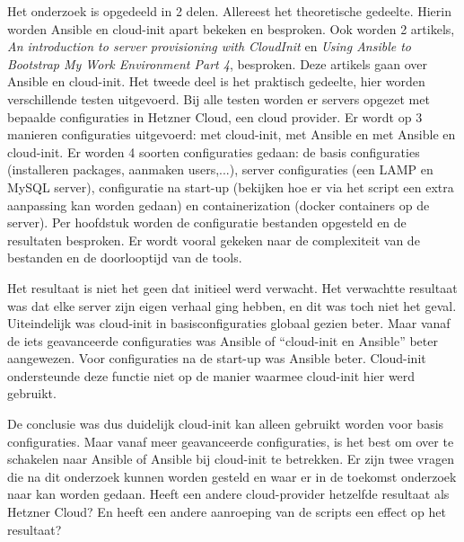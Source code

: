 Het onderzoek is opgedeeld in 2 delen. Allereest het theoretische gedeelte. Hierin worden Ansible en cloud-init apart bekeken en besproken. Ook worden 2 artikels, \textit{An introduction to server provisioning with CloudInit} en \textit{Using Ansible to Bootstrap My Work Environment Part 4}, besproken. Deze artikels gaan over Ansible en cloud-init. Het tweede deel is het praktisch gedeelte, hier worden verschillende testen uitgevoerd. Bij alle testen worden er servers opgezet met bepaalde configuraties in Hetzner Cloud, een cloud provider. Er wordt op 3 manieren configuraties uitgevoerd: met cloud-init, met Ansible en met Ansible en cloud-init.  Er worden 4 soorten configuraties gedaan: de basis configuraties (installeren packages, aanmaken users,...), server configuraties (een LAMP en MySQL server), configuratie na start-up (bekijken hoe er via het script een extra aanpassing kan worden gedaan) en containerization (docker containers op de server). Per hoofdstuk worden de configuratie bestanden opgesteld en de resultaten besproken. Er wordt vooral gekeken naar de complexiteit van de bestanden en de doorlooptijd van de tools.

\newpage
Het resultaat is niet het geen dat initieel werd verwacht. Het verwachtte resultaat was dat elke server zijn eigen verhaal ging hebben, en dit was toch niet het geval. Uiteindelijk was cloud-init in basisconfiguraties globaal gezien beter. Maar vanaf de iets geavanceerde configuraties was Ansible of ``cloud-init en Ansible'' beter aangewezen. Voor configuraties na de start-up was Ansible beter. Cloud-init ondersteunde deze functie niet op de manier waarmee cloud-init hier werd gebruikt.

De conclusie was dus duidelijk cloud-init kan alleen gebruikt worden voor basis configuraties. Maar vanaf meer geavanceerde configuraties, is het best om over te schakelen naar Ansible of Ansible bij cloud-init te betrekken. Er zijn twee vragen die na dit onderzoek kunnen worden gesteld en waar er in de toekomst onderzoek naar kan worden gedaan. Heeft een andere cloud-provider hetzelfde resultaat als Hetzner Cloud? En heeft een andere aanroeping van de scripts een effect op het resultaat?





